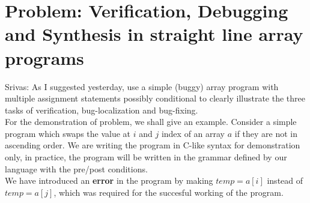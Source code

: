 \documentclass[a4paper, 12pt, notitlepage] {article}
\newcommand{\mscmt}[1]{{\color{blue} \tiny{Srivas: {#1}}}}
\begin{document}
\section {Problem: Verification, Debugging and Synthesis in straight line array programs}
\mscmt{As I suggested yesterday, use a simple (buggy) array program with multiple assignment statements possibly conditional to clearly illustrate the three tasks of verification, bug-localization and bug-fixing.}\\
For the demonstration of problem, we shall give an example. Consider a simple program which swaps the value at $i$ and $j$ index of an array $a$ if they are not in ascending order. We are writing the program in C-like syntax for demonstration only, in practice, the program will be written in the grammar defined by our language with the pre/post conditions. \\
We have introduced an {\bf error } in the program by making $temp = a[i]$ instead of $temp=a[j]$, which was required for the succesful working of the program.\\ 
\end{document}
